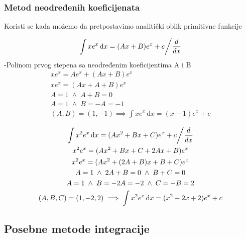\subsubsection{Metod neodređenih koeficijenata}
	Koristi se kada možemo da pretpostavimo analitički oblik primitivne funkcije
	\begin{example}
		$$\left. \int x e^x\, \mathrm{d}x = (Ax+B)e^x+c \middle/ \frac{d}{dx} \right.$$
		-Polinom prvog stepena sa neodređenim koeficijentima A i B
		\begin{gather*}
			xe^x = A e^x + (Ax+B)e^x\\
			xe^x = (Ax+A+B)e^x\\
			A=1 \; \wedge  \; A+B = 0\\
			A=1 \; \wedge \; B=-A=-1\\
			(A, B) = (1, -1) \implies \int xe^x \, \mathrm{d}x= (x-1)e^x +c
		\end{gather*}
	\end{example}
	\begin{example}
		\begin{gather*}
			\left. \int x^2 e^x \, \mathrm{d}x = (Ax^2+Bx+C)e^x +c \middle/ \frac{d}{dx} \right.\\
			x^2 e^x = (Ax^2+Bx+C+2Ax+B)e^x\\
			x^2 e^x = (Ax^2+(2A+B)x+B+C)e^x\\
			A = 1 \; \wedge \; 2A+B = 0 \; \wedge \;  B+C = 0\\
			A = 1 \; \wedge \; B = -2A = -2 \; \wedge \; C = -B = 2\\
			(A, B, C) = (1, -2, 2) \implies \int x^2 e^x \, \mathrm{d}x = (x^2-2x+2)e^x+c
		\end{gather*}
	\end{example}

\subsection{Posebne metode integracije}

